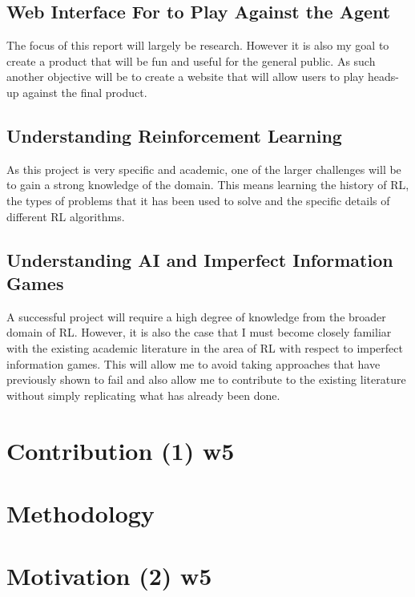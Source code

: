 \subsection{Web Interface For to Play Against the Agent}\label{subsec:webInterface}
The focus of this report will largely be research.
However it is also my goal to create a product that will be fun and useful for the general public.
As such another objective will be to create a website that will allow users to play heads-up against the final product.

\subsection{Understanding Reinforcement Learning}\label{subsec:understandingRL}
As this project is very specific and academic, one of the larger challenges will be to gain a strong knowledge
of the domain.
This means learning the history of RL, the types of problems that it has been used to solve and the specific details of
different RL algorithms.

\subsection{Understanding AI and Imperfect Information Games}\label{subsec:aiInImperfectinfo}
A successful project will require a high degree of knowledge from the broader domain of RL. However, it is also the case
that I must become closely familiar with the existing academic literature in the area of RL with respect to imperfect
information games.
This will allow me to avoid taking approaches that have previously shown to fail and also allow me to contribute to
the existing literature without simply replicating what has already been done.


\section{Contribution (1) w5}\label{sec:contribution}

\section{Methodology}\label{sec:methodology}


\section{Motivation (2) w5}\label{sec:Motivation}